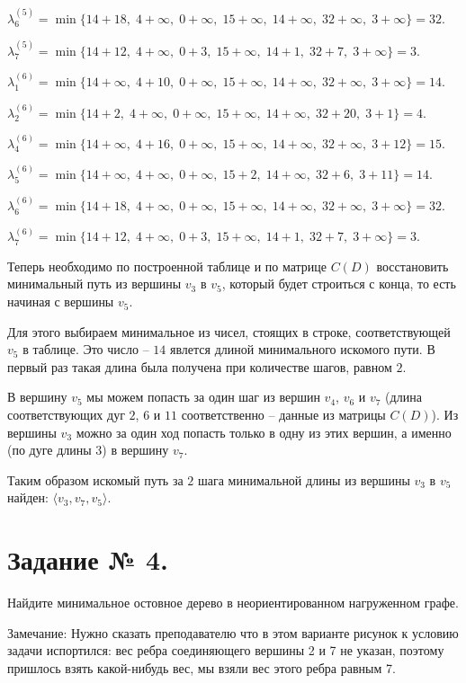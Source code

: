 \documentclass[fleqn]{article}
\begin{document}
$\lambda_6^{(5)} =\min\{14+18,\; 4+\infty,\; 0+\infty,\; 15+\infty,\; 14+\infty,\; 32+\infty,\; 3+\infty\}=32.$

$\lambda_7^{(5)} =\min\{14+12,\; 4+\infty,\; 0+3,\; 15+\infty,\; 14+1,\; 32+7,\; 3+\infty\}=3.$

\medskip

$\lambda_1^{(6)} =\min\{14+\infty,\; 4+10,\; 0+\infty,\; 15+\infty,\; 14+\infty,\; 32+\infty,\; 3+\infty\}=14.$

$\lambda_2^{(6)} =\min\{14+2,\; 4+\infty,\; 0+\infty,\; 15+\infty,\; 14+\infty,\; 32+20,\; 3+1\}=4.$

$\lambda_4^{(6)} =\min\{14+\infty,\; 4+16,\; 0+\infty,\; 15+\infty,\; 14+\infty,\; 32+\infty,\; 3+12\}=15.$

$\lambda_5^{(6)} =\min\{14+\infty,\; 4+\infty,\; 0+\infty,\; 15+2,\; 14+\infty,\; 32+6,\; 3+11\}=14.$

$\lambda_6^{(6)} =\min\{14+18,\; 4+\infty,\; 0+\infty,\; 15+\infty,\; 14+\infty,\; 32+\infty,\; 3+\infty\}=32.$

$\lambda_7^{(6)} =\min\{14+12,\; 4+\infty,\; 0+3,\; 15+\infty,\; 14+1,\; 32+7,\; 3+\infty\}=3.$

\medskip

Теперь необходимо по построенной таблице и по матрице $C(D)$ восстановить минимальный путь из вершины $v_3$ в $v_5$, который будет строиться с конца, то есть начиная с вершины $v_5$.

Для этого выбираем минимальное из чисел, стоящих в строке, соответствующей $v_5$ в таблице. Это число – $14$ явлется длиной минимального искомого пути. В первый раз такая длина была получена при количестве шагов, равном $2$.

В вершину $v_5$ мы можем попасть за один шаг из вершин $v_4$, $v_6$ и $v_7$ (длина соответствующих дуг $2$, $6$ и $11$ соответственно – данные из матрицы $C(D)$). Из вершины $v_3$ можно за один ход попасть только в одну из этих вершин, а именно (по дуге длины $3$) в вершину $v_7$.

Таким образом искомый путь за $2$ шага минимальной длины из вершины $v_3$ в $v_5$ найден: $\langle v_3, v_7, v_5\rangle$.

\section*{Задание № 4.}

Найдите минимальное остовное дерево в неориентированном нагруженном графе.

Замечание: Нужно сказать преподавателю что в этом варианте рисунок к условию задачи испортился: вес ребра соединяющего вершины 2 и 7 не указан, поэтому пришлось взять какой-нибудь вес, мы взяли вес этого ребра равным 7.
\end{document}
